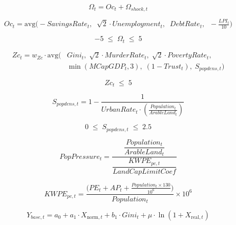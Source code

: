 \documentclass{article}
\begin{document}
\begin{equation}
\Omega_t = Oc_t + \Omega_{shock,t}
\end{equation}

\begin{equation}
Oc_t = \mathrm{avg}\Big( -SavingsRate_t,\;\; \sqrt{2} \cdot Unemployment_t,\;\; 
DebtRate_t,\;\; -\tfrac{LPI_t}{10} \Big)
\end{equation}

\begin{equation}
-5 \; \leq \; \Omega_t \; \leq \; 5
\end{equation}

\begin{equation}
\begin{aligned}
Zc_t = w_{Zc} \cdot \mathrm{avg}\Big(& Gini_t,\; \sqrt{2} \cdot MurderRate_t,\; 
\sqrt{2} \cdot PovertyRate_t, \\
& \min(MCapGDP_t,3),\; (1 - Trust_t),\; S_{popdens,t} \Big)
\end{aligned}
\end{equation}

\begin{equation}
Zc_t \; \leq \; 5
\end{equation}

\begin{equation}
S_{popdens,t} = 1 - \frac{1}{UrbanRate_t \cdot \left( \frac{Population_t}{ArableLand_t} \right)}
\end{equation}

\begin{equation}
0 \; \leq \; S_{popdens,t} \; \leq \; 2.5
\end{equation}

\begin{equation}
PopPressure_t =
\frac{\dfrac{Population_t}{ArableLand_t}}
{\dfrac{KWPE_{pc,t}}{LandCapLimitCoef}}
\end{equation}

\begin{equation}
KWPE_{pc,t} =
\frac{ \big( PE_t + AP_t + \tfrac{Population_t \times 130}{10^6} \big) }
{Population_t} \times 10^6
\end{equation}

\begin{equation}
Y_{base,t} = a_0 + a_1 \cdot X_{\mathrm{norm},t} + b_1 \cdot Gini_t + \mu \cdot \ln(1 + X_{\mathrm{real},t})
\end{equation}
\end{document}
